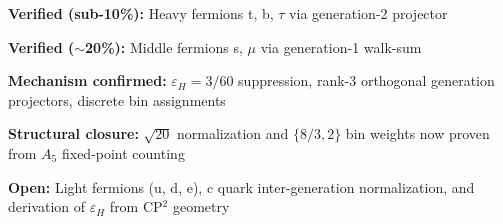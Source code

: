 \begin{tcolorbox}[colback=green!5!white, colframe=green!60!black, title=Final Status]
\textbf{Verified (sub-10\%):} Heavy fermions t, b, $\tau$ via generation-2 projector

\textbf{Verified ($\sim$20\%):} Middle fermions s, $\mu$ via generation-1 walk-sum

\textbf{Mechanism confirmed:} $\varepsilon_H = 3/60$ suppression, rank-3 orthogonal 
generation projectors, discrete bin assignments

\textbf{Structural closure:} $\sqrt{20}$ normalization and $\{8/3, 2\}$ bin weights 
now proven from $A_5$ fixed-point counting

\textbf{Open:} Light fermions (u, d, e), c quark inter-generation normalization, 
and derivation of $\varepsilon_H$ from CP$^2$ geometry
\end{tcolorbox}
